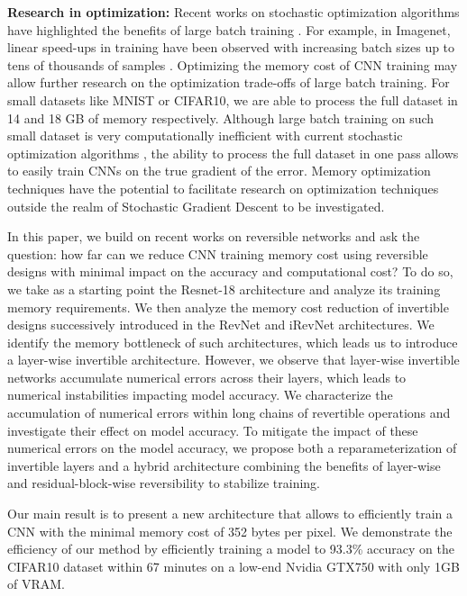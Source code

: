 \documentclass[twocolumn]{bmcart}
\begin{document}
\textbf{Research in optimization:}
Recent works on stochastic optimization algorithms have highlighted the benefits of large batch training \cite{shallue2018measuring,largebatch}.
For example, in Imagenet, linear speed-ups in training have been observed with increasing batch sizes up to tens of thousands of samples \cite{largebatch}.
Optimizing the memory cost of CNN training may allow further research on the optimization trade-offs of large batch training.
For small datasets like MNIST or CIFAR10, we are able to process the full dataset in 14 and 18 GB of memory respectively.
Although large batch training on such small dataset is very computationally inefficient with current stochastic optimization algorithms \cite{largebatch},
the ability to process the full dataset in one pass allows to easily train CNNs on the true gradient of the error.
Memory optimization techniques have the potential to facilitate research on optimization techniques outside the realm of Stochastic Gradient Descent to be investigated.

In this paper, we build on recent works on reversible networks \cite{gomez2017reversible,jacobsen2018revnet} and ask the question:
how far can we reduce CNN training memory cost using reversible designs with minimal impact on the accuracy and computational cost?
To do so, we take as a starting point the Resnet-18 architecture and analyze its training memory requirements.
We then analyze the memory cost reduction of invertible designs successively introduced in the RevNet and iRevNet architectures.
We identify the memory bottleneck of such architectures, which leads us to introduce a layer-wise invertible architecture.
However, we observe that layer-wise invertible networks accumulate numerical errors across their layers, which leads to numerical instabilities impacting model accuracy.
We characterize the accumulation of numerical errors within long chains of revertible operations and investigate their effect on model accuracy.
To mitigate the impact of these numerical errors on the model accuracy, we propose both a reparameterization of invertible layers and a hybrid architecture combining the benefits of layer-wise and residual-block-wise reversibility to stabilize training.

Our main result is to present a new architecture that allows to efficiently train a CNN with the minimal memory cost of 352 bytes per pixel.
We demonstrate the efficiency of our method by efficiently training a model to 93.3\% accuracy on the CIFAR10 dataset within 67 minutes on a low-end Nvidia GTX750 with only 1GB of VRAM.
\end{document}
